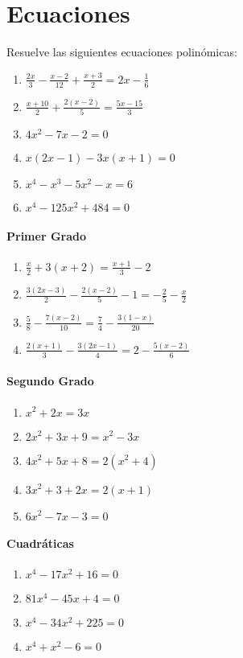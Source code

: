 \section{Ecuaciones}

\Exercicio Resuelve las siguientes ecuaciones polinómicas:
\begin{enumerate}[topsep=0pt]
	\item $\frac{2x}{3} - \frac{x-2}{12} + \frac{x+3}{2} = 2x - \frac{1}{6}$
	\item $\frac{x+10}{2} + \frac{2(x-2)}{5} = \frac{5x-15}{3}$
	\item $4x^2-7x -2 = 0$
	\item $x(2x-1) -3x(x+1) = 0$
	\item $x^4-x^3-5x^2-x= 6$
	\item $x^4- 125x^2 + 484 = 0$
\end{enumerate}

\paragraph{Primer Grado}
\begin{enumerate}[topsep=0pt]
	\item $\frac{x}{2} + 3(x + 2) = \frac{x + 1}{3} - 2$
	\item $\frac{3(2x-3)}{2} - \frac{2(x-2)}{5} - 1 = -\frac{2}{5} - \frac{x}{2}$
	\item $\frac{5}{8} - \frac{7(x-2)}{10} = \frac{7}{4} - \frac{3(1-x)}{20}$
	\item $\frac{2(x+1)}{3} - \frac{3(2x-1)}{4} = 2 - \frac{5(x-2)}{6}$
\end{enumerate}

\paragraph{Segundo Grado}
\begin{enumerate}[topsep=0pt]
	\item $x^2 + 2x = 3x$
	\item $2x^2 + 3x + 9 = x^2 - 3x$
	\item $4x^2 + 5x + 8 = 2(x^2 + 4)$
	\item $3x^2 + 3 +2x = 2 (x + 1)$
	\item $6x^2 - 7x - 3 = 0$
\end{enumerate}

\paragraph{Cuadráticas}
\begin{enumerate}[topsep=0pt]
	\item $x^4 - 17x^2 + 16 = 0$
	\item $81x^4 - 45x + 4 = 0$
	\item $x^4 - 34x^2 + 225 = 0$
	\item $x^4 + x^2 - 6 = 0$
\end{enumerate}


